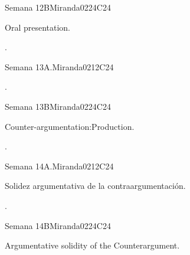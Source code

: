\begin{syllabus}
\begin{unit}{Semana 12B}{}{Miranda02}{24}{C24}
   \begin{topics}
      \item Oral presentation.
   \end{topics}

   \begin{learningoutcomes}
      \item .
      \end{learningoutcomes}
\end{unit}

\begin{unit}{Semana 13A.}{}{Miranda02}{12}{C24}
   \begin{topics}
      \item .
   \end{topics}
   \begin{learningoutcomes}
      \item 
   \end{learningoutcomes}
\end{unit}

\begin{unit}{Semana 13B}{}{Miranda02}{24}{C24}
   \begin{topics}
      \item Counter-argumentation:Production.
   \end{topics}

   \begin{learningoutcomes}
      \item . 
      \end{learningoutcomes}
\end{unit}

\begin{unit}{Semana 14A.}{}{Miranda02}{12}{C24}
   \begin{topics}
      \item Solidez argumentativa de la contraargumentación. 
   \end{topics}
   \begin{learningoutcomes}
      \item .
   \end{learningoutcomes}
\end{unit}

\begin{unit}{Semana 14B}{}{Miranda02}{24}{C24}
   \begin{topics}
      \item Argumentative solidity of the Counterargument.
   \end{topics}


\end{unit}
\end{syllabus}

